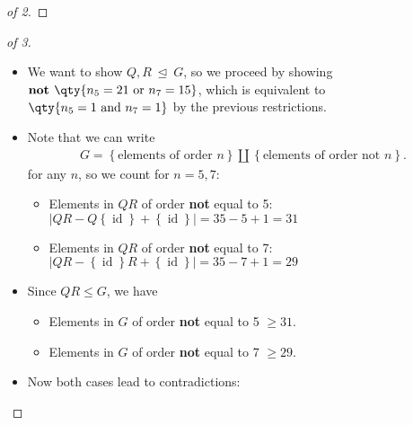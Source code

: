 \begin{solution}
\begin{proof}[of 2]
\end{proof}


\begin{proof}[of 3]

\envlist

\begin{itemize}
\item
  We want to show \(Q, R{~\trianglelefteq~}G\), so we proceed by showing
  \(\textbf{not }\qty{n_5 = 21 \text{ or } n_7 = 15}\), which is
  equivalent to \(\qty{n_5 = 1 \text{ and } n_7 = 1}\) by the previous
  restrictions.
\item
  Note that we can write
  \begin{align*}
  G = \left\{{\text{elements of order } n}\right\} {\textstyle\coprod}\left\{{\text{elements of order not } n}\right\}
  .\end{align*}
  for any \(n\), so we count for \(n=5, 7\):

  \begin{itemize}
  \tightlist
  \item
    Elements in \(QR\) of order \textbf{not} equal to 5:
    \({\left\lvert {QR - Q\left\{{\operatorname{id}}\right\} + \left\{{\operatorname{id}}\right\}} \right\rvert} = 35 - 5 + 1 = 31\)
  \item
    Elements in \(QR\) of order \textbf{not} equal to 7:
    \({\left\lvert {QR - \left\{{\operatorname{id}}\right\}R + \left\{{\operatorname{id}}\right\}} \right\rvert} = 35 - 7 + 1 = 29\)
  \end{itemize}
\item
  Since \(QR \leq G\), we have

  \begin{itemize}
  \tightlist
  \item
    Elements in \(G\) of order \textbf{not} equal to 5 \(\geq 31\).
  \item
    Elements in \(G\) of order \textbf{not} equal to 7 \(\geq 29\).
  \end{itemize}
\item
  Now both cases lead to contradictions:


\end{itemize}
\end{proof}
\end{solution}
